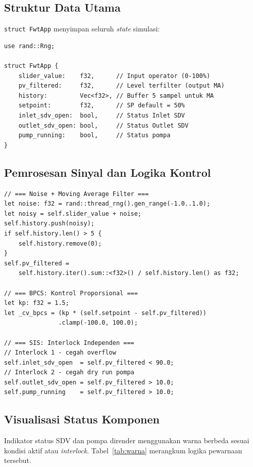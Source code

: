 \documentclass[12pt,a4paper]{article}
\begin{document}
\subsection{Struktur Data Utama}
\texttt{struct FwtApp} menyimpan seluruh \textit{state} simulasi:

\begin{lstlisting}[caption={Definisi struct FwtApp}]
use rand::Rng;

struct FwtApp {
    slider_value:    f32,      // Input operator (0-100%)
    pv_filtered:     f32,      // Level terfilter (output MA)
    history:         Vec<f32>, // Buffer 5 sampel untuk MA
    setpoint:        f32,      // SP default = 50%
    inlet_sdv_open:  bool,     // Status Inlet SDV
    outlet_sdv_open: bool,     // Status Outlet SDV
    pump_running:    bool,     // Status pompa
}
\end{lstlisting}

\subsection{Pemrosesan Sinyal dan Logika Kontrol}
\begin{lstlisting}[caption={Noise filter, BPCS, dan SIS interlock}]
// === Noise + Moving Average Filter ===
let noise: f32 = rand::thread_rng().gen_range(-1.0..1.0);
let noisy = self.slider_value + noise;
self.history.push(noisy);
if self.history.len() > 5 {
    self.history.remove(0);
}
self.pv_filtered =
    self.history.iter().sum::<f32>() / self.history.len() as f32;

// === BPCS: Kontrol Proporsional ===
let kp: f32 = 1.5;
let _cv_bpcs = (kp * (self.setpoint - self.pv_filtered))
               .clamp(-100.0, 100.0);

// === SIS: Interlock Independen ===
// Interlock 1 - cegah overflow
self.inlet_sdv_open  = self.pv_filtered < 90.0;
// Interlock 2 - cegah dry run pompa
self.outlet_sdv_open = self.pv_filtered > 10.0;
self.pump_running    = self.pv_filtered > 10.0;
\end{lstlisting}

\subsection{Visualisasi Status Komponen}
Indikator status SDV dan pompa dirender menggunakan warna berbeda sesuai
kondisi aktif atau \textit{interlock}. Tabel~\ref{tab:warna} merangkum
logika pewarnaan tersebut.
\end{document}
